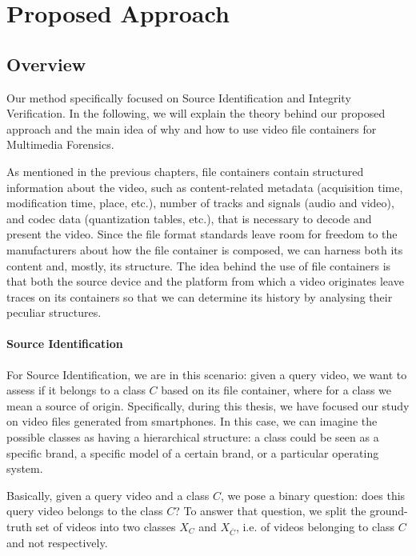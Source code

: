 \chapter{Proposed Approach}

\section{Overview}

Our method specifically focused on Source Identification and Integrity Verification. In the following, we will explain the theory behind our proposed approach and the main idea of why and how to use video file containers for Multimedia Forensics.

As mentioned in the previous chapters, file containers contain structured information about the video, such as content-related metadata (acquisition time, modification time, place, etc.), number of tracks and signals (audio and video), and codec data (quantization tables, etc.), that is necessary to decode and present the video. Since the file format standards leave room for freedom to the manufacturers about how the file container is composed, we can harness both its content and, mostly, its structure. The idea behind the use of file containers is that both the source device and the platform from which a video originates leave traces on its containers so that we can determine its history by analysing their peculiar structures.

\subsubsection*{Source Identification}

For Source Identification, we are in this scenario: given a query video, we want to assess if it belongs to a class $C$ based on its file container, where for a class we mean a source of origin. Specifically, during this thesis, we have focused our study on video files generated from smartphones. In this case, we can imagine the possible classes as having a hierarchical structure: a class could be seen as a specific brand, a specific model of a certain brand, or a particular operating system.

Basically, given a query video and a class $C$, we pose a binary question: does this query video belongs to the class $C$? To answer that question, we split the ground-truth set of videos into two classes $X_{C}$ and $X_{\overline{C}}$, i.e. of videos belonging to class $C$ and not respectively.

